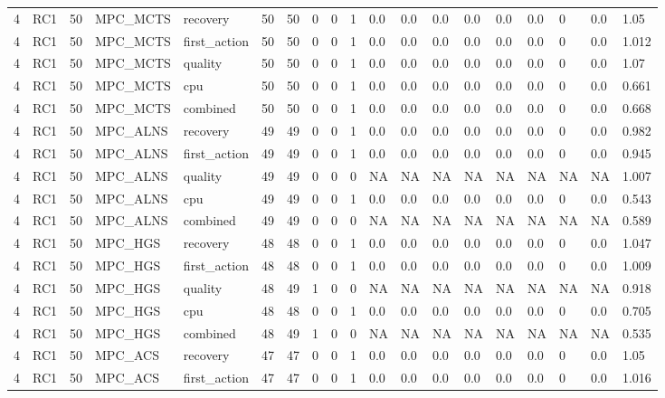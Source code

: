 \begin{tabular}{lllllllllllllllllll}
4 & RC1 & 50 & MPC\_MCTS & recovery & 50 & 50 & 0 & 0 & 1 & 0.0 & 0.0 & 0.0 & 0.0 & 0.0 & 0.0 & 0 & 0.0 & 1.05 \\
4 & RC1 & 50 & MPC\_MCTS & first\_action & 50 & 50 & 0 & 0 & 1 & 0.0 & 0.0 & 0.0 & 0.0 & 0.0 & 0.0 & 0 & 0.0 & 1.012 \\
4 & RC1 & 50 & MPC\_MCTS & quality & 50 & 50 & 0 & 0 & 1 & 0.0 & 0.0 & 0.0 & 0.0 & 0.0 & 0.0 & 0 & 0.0 & 1.07 \\
4 & RC1 & 50 & MPC\_MCTS & cpu & 50 & 50 & 0 & 0 & 1 & 0.0 & 0.0 & 0.0 & 0.0 & 0.0 & 0.0 & 0 & 0.0 & 0.661 \\
4 & RC1 & 50 & MPC\_MCTS & combined & 50 & 50 & 0 & 0 & 1 & 0.0 & 0.0 & 0.0 & 0.0 & 0.0 & 0.0 & 0 & 0.0 & 0.668 \\
4 & RC1 & 50 & MPC\_ALNS & recovery & 49 & 49 & 0 & 0 & 1 & 0.0 & 0.0 & 0.0 & 0.0 & 0.0 & 0.0 & 0 & 0.0 & 0.982 \\
4 & RC1 & 50 & MPC\_ALNS & first\_action & 49 & 49 & 0 & 0 & 1 & 0.0 & 0.0 & 0.0 & 0.0 & 0.0 & 0.0 & 0 & 0.0 & 0.945 \\
4 & RC1 & 50 & MPC\_ALNS & quality & 49 & 49 & 0 & 0 & 0 & NA & NA & NA & NA & NA & NA & NA & NA & 1.007 \\
4 & RC1 & 50 & MPC\_ALNS & cpu & 49 & 49 & 0 & 0 & 1 & 0.0 & 0.0 & 0.0 & 0.0 & 0.0 & 0.0 & 0 & 0.0 & 0.543 \\
4 & RC1 & 50 & MPC\_ALNS & combined & 49 & 49 & 0 & 0 & 0 & NA & NA & NA & NA & NA & NA & NA & NA & 0.589 \\
4 & RC1 & 50 & MPC\_HGS & recovery & 48 & 48 & 0 & 0 & 1 & 0.0 & 0.0 & 0.0 & 0.0 & 0.0 & 0.0 & 0 & 0.0 & 1.047 \\
4 & RC1 & 50 & MPC\_HGS & first\_action & 48 & 48 & 0 & 0 & 1 & 0.0 & 0.0 & 0.0 & 0.0 & 0.0 & 0.0 & 0 & 0.0 & 1.009 \\
4 & RC1 & 50 & MPC\_HGS & quality & 48 & 49 & 1 & 0 & 0 & NA & NA & NA & NA & NA & NA & NA & NA & 0.918 \\
4 & RC1 & 50 & MPC\_HGS & cpu & 48 & 48 & 0 & 0 & 1 & 0.0 & 0.0 & 0.0 & 0.0 & 0.0 & 0.0 & 0 & 0.0 & 0.705 \\
4 & RC1 & 50 & MPC\_HGS & combined & 48 & 49 & 1 & 0 & 0 & NA & NA & NA & NA & NA & NA & NA & NA & 0.535 \\
4 & RC1 & 50 & MPC\_ACS & recovery & 47 & 47 & 0 & 0 & 1 & 0.0 & 0.0 & 0.0 & 0.0 & 0.0 & 0.0 & 0 & 0.0 & 1.05 \\
4 & RC1 & 50 & MPC\_ACS & first\_action & 47 & 47 & 0 & 0 & 1 & 0.0 & 0.0 & 0.0 & 0.0 & 0.0 & 0.0 & 0 & 0.0 & 1.016 \\

\end{tabular}
